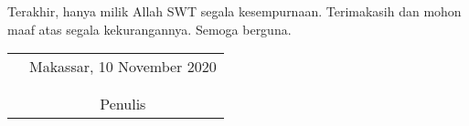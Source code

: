 \documentclass[skripsi]{unhasskripsi}
\theoremstyle{definition}
\begin{document}
    Terakhir, hanya milik Allah SWT segala kesempurnaan. Terimakasih dan mohon maaf atas segala kekurangannya. Semoga berguna.

    \vspace{0.8cm}

    \begin{tabular}{p{7.5cm}c}
        &Makassar, 10 November 2020\\
        &\\
        &\\
        &Penulis
    \end{tabular}

    \makeatletter
    \renewcommand\l@chapter[2]{%
    \ifnum \c@tocdepth >\z@
    \addpenalty\@secpenalty
    \addvspace{0.75em \@plus\p@}%
    \setlength\@tempdima{1.5em}%
    \begingroup
      \parindent \z@ \rightskip \@pnumwidth
      \parfillskip -\@pnumwidth
      \leavevmode \bfseries
      \advance\leftskip\@tempdima
      \hskip -\leftskip
      #1\nobreak\
      \leaders\hbox{$\m@th\mkern \@dotsep mu\hbox{.}\mkern \@dotsep mu$}
     \hfil \nobreak\hb@xt@\@pnumwidth{\hss #2}\par
    \endgroup
    \fi}
    \makeatother

    \tableofcontents


    \listoftables

    \listoffigures
\end{document}
